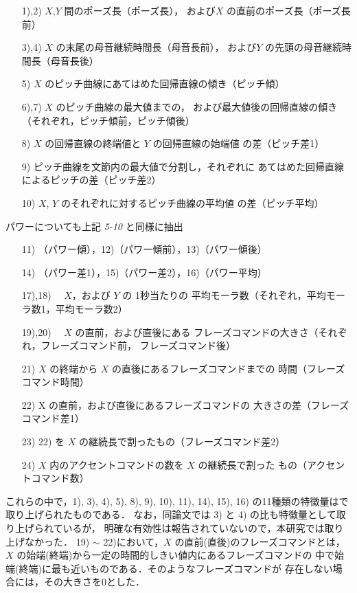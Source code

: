 \begin{itemize}
\item[1),2)] $X$,$Y$ 間のポーズ長（ポーズ長），
および$X$ の直前のポーズ長（ポーズ長前）
\item[3),4)] $X$ の末尾の母音継続時間長（母音長前），
および$Y$ の先頭の母音継続時間長（母音長後）
\item[5)] $X$ のピッチ曲線にあてはめた回帰直線の傾き（ピッチ傾）
\item[6),7)]$X$ のピッチ曲線の最大値までの，
および最大値後の回帰直線の傾き（それぞれ，ピッチ傾前，ピッチ傾後）
\item[8)] $X$ の回帰直線の終端値と $Y$ の回帰直線の始端値
の差（ピッチ差1）
\item[9)] ピッチ曲線を文節内の最大値で分割し，それぞれに
あてはめた回帰直線によるピッチの差（ピッチ差2）
\item[10)]$X$, $Y$ のそれぞれに対するピッチ曲線の平均値
の差（ピッチ平均）
\end{itemize}

パワーについても上記 {\it 5-10} と同様に抽出
\begin{itemize}
\item[11)]（パワー傾），12)（パワー傾前），13)（パワー傾後）
\item[14)]（パワー差1），15)（パワー差2），16)（パワー平均）
\end{itemize}
\vspace{5mm}
\begin{itemize}
\item[17),18)]\ \  $X$，および $Y$ の 1秒当たりの
平均モーラ数（それぞれ，平均モーラ数1，平均モーラ数2）
\item[19),20)]\ \  $X$ の直前，および直後にある
フレーズコマンドの大きさ（それぞれ，フレーズコマンド前，
フレーズコマンド後）
\item[21)] $X$ の終端から $X$ の直後にあるフレーズコマンドまでの
時間（フレーズコマンド時間）
\item[22)] X の直前，および直後にあるフレーズコマンドの
大きさの差（フレーズコマンド差1）
\item[23)] 22) を $X$ の継続長で割ったもの（フレーズコマンド差2）
\item[24)] $X$ 内のアクセントコマンドの数を $X$ の継続長で割った
もの（アクセントコマンド数）
\end{itemize}
\vspace{5mm}

これらの中で，1), 3), 4), 5), 8), 9), 10), 11), 14), 15), 16) 
の11種類の特徴量は\cite{OZE-4}で取り上げられたものである．
なお，同論文では 3) と 4) の比も特徴量として取り上げられているが，
明確な有効性は報告されていないので，本研究では取り上げなかった．
19) $\sim$ 22)において，$X$ の直前(直後)のフレーズコマンドとは，
$X$ の始端(終端)から一定の時間的しきい値内にあるフレーズコマンドの
中で始端(終端)に最も近いものである．そのようなフレーズコマンドが
存在しない場合には，その大きさを0とした．


